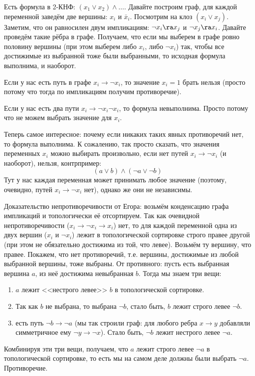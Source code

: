 	Есть формула в 2-КНФ: $(x_1 \lor x_2) \land \dots$.
	Давайте построим граф, для каждой переменной заведём две вершины: $x_i$ и $\bar x_i$.
	Посмотрим на клоз $(x_i \lor x_j)$.
	Заметим, что он равносилен двум импликациям: $\lnot x_i \ra x_j$ и $\lnot x_j \ra x_i$.
	Давайте проведём такие рёбра в графе.
	Получаем, что если мы выберем в графе ровно половину вершины (при этом выберем либо $x_i$,
	либо $\lnot x_i$) так, чтобы все достижимые из выбранной тоже были выбранными, то исходная формула выполнима,
	и наоборот.
	
	\begin{assertion}
		Если у нас есть путь в графе $x_i \to \lnot x_i$, то значение
		$x_i=1$ брать нельзя (просто потому что тогда по импликациям получим противоречие).
	\end{assertion}
	\begin{assertion}
		Если у нас есть два пути $x_i \to \lnot x_i \lnot x_i$, то формула невыполнима.
		Просто потому что не можем выбрать значение для $x_i$.
	\end{assertion}

	Теперь самое интересное: почему если никаких таких явных противоречий нет, то формула выполнима.
	К сожалению, так просто сказать, что значения переменных $x_i$ можно выбирать произвольно, если
	нет путей $x_i \to \lnot x_i$ (и наоборот), нельзя, контрпример:
	\[ (a \lor b) \land (\lnot a \lor \lnot b) \]
	Тут у нас каждая переменная может принимать любое значение (поэтому, очевидно, путей $x_i \to \lnot x_i$
	нет), однако же они не независимы.

	Доказательство непротиворечивости от Егора: возьмём конденсацию графа импликаций и топологически её отсортируем.
	Так как очевидной непротиворечивости ($x_i \to \lnot x_i \to x_i$) нет, то для 
	каждой переменной одна из двух вершин ($x_i$ и $\lnot x_i$) лежит в топологической сортировке строго правее другой
	(при этом не обязательно достижима из той, что левее).
	Возьмём ту вершину, что правее.
	Покажем, что нет противоречий, т.е. вершины, достижимые из любой выбранной вершины, тоже выбраны.
	От противного: пусть есть выбранная вершина $a$, из неё достижима невыбранная $b$.
	Тогда мы знаем три вещи:
	\begin{enumerate}
		\item $a$ лежит <<нестрого левее>> $b$ в топологической сортировке.
		\item Так как $b$ не выбрана, то выбрана $\lnot b$, стало быть, $b$ лежит строго левее $\lnot b$.
		\item
			есть путь $\lnot b \to \lnot a$ (мы так строили граф: для любого ребра $x \to y$
			добавляли симметричное ему $\lnot y \to \lnot x$).
			Стало быть, $\lnot b$ лежит нестрого левее $\lnot a$.
	\end{enumerate}
	Комбинируя эти три вещи, получаем, что $a$ лежит строго левее $\lnot a$ в топологической сортировке,
	то есть мы на самом деле должны были выбрать $\lnot a$.
	Противоречие.

